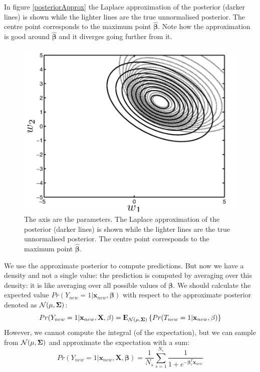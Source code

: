 \documentclass[12pt, letterpaper]{article}
\theoremstyle{definition}
\newcommand{\E}{{\rm I\kern-.3em E}}
\newcommand{\X}{\mathrm{\mathbf{X}}}
\newcommand{\be}{\mathbf{\beta}}
\newcommand{\hbe}{\hat{\mathbf{\beta}}}
\newcommand{\x}{\mathbf{x}}
\begin{document}
In figure \autoref{posteriorApprox} the Laplace approximation of the posterior (darker lines) is shown while the lighter lines are the true unnormalised posterior. The centre point corresponds to the maximum point $\hbe$. Note how the approximation is good around $\hbe$ and it diverges going further from it.
\begin{figure}
\centering
\includegraphics[scale=0.4]{img/posteriorApprox}
\caption{The axis are the parameters. The Laplace approximation of the posterior (darker lines) is shown while the lighter lines are the true unnormalised posterior. The centre point corresponds to the maximum point $\hbe$.}
\label{posteriorApprox}
\end{figure}

We use the approximate posterior to compute predictions. But now we have a density and not a single value: the prediction is computed by averaging over this density: it is like averaging over all possible values of $\be$. We should calculate the expected value $Pr(Y_{new} = 1|\x_{new}, \be)$ with respect to the approximate posterior denoted as $\CMcal{N}(\mathbf{\mu, \Sigma})$:
\begin{equation}
Pr(Y_{new}=1|\x_{new}, \X, \be) = \E_{\CMcal{N}(\mathbf{\mu, \Sigma})}\left\lbrace Pr(T_{new}=1| \x_{new}, \be)\right\rbrace
\end{equation}
However, we cannot compute the integral (of the expectation), but we can sample from $\CMcal{N}(\mathbf{\mu, \Sigma})$ and approximate the expectation with a sum:
\begin{equation}
\label{approxDen}
Pr(Y_{new}=1|\x_{new}, \X, \be) = \frac{1}{N_s}\sum_{s=1}^{N_s}\frac{1}{1+e^{-\be_s^T \x_{new}}}
\end{equation}
\end{document}
